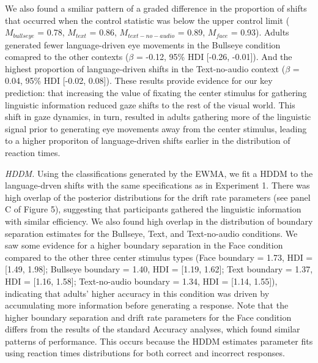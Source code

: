 \documentclass[english,floatsintext,man]{apa6}
\begin{document}
We also found a smiliar pattern of a graded difference in the proportion
of shifts that occurred when the control statistic was below the upper
control limit (\(M_{bullseye}\) = 0.78, \(M_{text}\) = 0.86,
\(M_{text-no-audio}\) = 0.89, \(M_{face}\) = 0.93). Adults generated
fewer language-driven eye movements in the Bullseye condition comapred
to the other contexts (\(\beta\) = -0.12, 95\% HDI {[}-0.26, -0.01{]}).
And the highest proportion of language-driven shifts in the
Text-no-audio context (\(\beta\) = 0.04, 95\% HDI {[}-0.02, 0.08{]}).
These results provide evidence for our key prediction: that increasing
the value of fixating the center stimulus for gathering linguistic
information reduced gaze shifts to the rest of the visual world. This
shift in gaze dynamics, in turn, resulted in adults gathering more of
the linguistic signal prior to generating eye movements away from the
center stimulus, leading to a higher proporiton of language-driven
shifts earlier in the distribution of reaction times.

\emph{HDDM.} Using the classifications generated by the EWMA, we fit a
HDDM to the language-drven shifts with the same specifications as in
Experiment 1. There was high overlap of the posterior distributions for
the drift rate parameters (see panel C of Figure 5), suggesting that
participants gathered the linguistic information with similar
efficiency. We also found high overlap in the distribution of boundary
separation estimates for the Bullseye, Text, and Text-no-audio
conditions. We saw some evidence for a higher boundary separation in the
Face condition compared to the other three center stimulus types (Face
boundary = 1.73, HDI = {[}1.49, 1.98{]}; Bullseye boundary = 1.40, HDI =
{[}1.19, 1.62{]}; Text boundary = 1.37, HDI = {[}1.16, 1.58{]};
Text-no-audio boundary = 1.34, HDI = {[}1.14, 1.55{]}), indicating that
adults' higher accuracy in this condition was driven by accumulating
more information before generating a response. Note that the higher
boundary separation and drift rate parameters for the Face condition
differs from the results of the standard Accuracy analyses, which found
similar patterns of performance. This occurs because the HDDM estimates
parameter fits using reaction times distributions for both correct and
incorrect responses.
\end{document}
